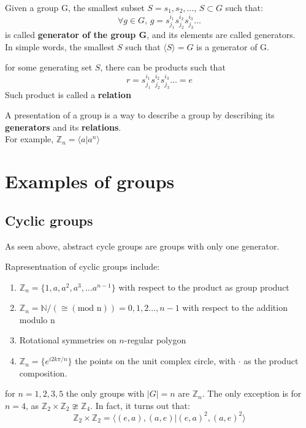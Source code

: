 \begin{definition}
  Given a group G, the smallest subset  $S={s_1,s_2,\dots}$,  $ S \subset G$ such that:
  \[
    \forall g \in G, \, g = s_{j_1}^{i_1}s_{j_2}^{i_2}s_{j_3}^{i_3} \dots
  \]
  is called \textbf{generator of the group G}, and its elements are called generators. \\
  In simple words, the smallest $S$ such that $\langle S \rangle = G$ is a generator of G.
\end{definition}
for some generating set $S$, there can be products such that
\[
  r = s_{j_1}^{i_1}s_{j_2}^{i_2}s_{j_3}^{i_3} \dots = e
\]
Such product is called a \textbf{relation}
\begin{definition}
  A presentation of a group is a way to describe a group by describing its \textbf{generators} and its \textbf{relations}.\\
  For example, $\mathbb{Z}_n = \langle a | a^n \rangle$
\end{definition}
\section{Examples of groups}
\subsection{Cyclic groups}
\begin{definition}
  As seen above, abstract cycle groups are groups with only one generator.
\end{definition}
Rapresentnation of cyclic groups include:
\begin{enumerate}
  \item $\mathbb{Z}_n = \{1, a, a^2, a^3,\dots a^{n-1}\}$ with respect to the product as group product
  \item 
$\mathbb{Z}_{n} = \mathbb{N} / (\cong (\text{mod n} )) = {0,1,2\dots,n-1}$ with respect to the addition modulo n
\item 
Rotational symmetries on $n$-regular polygon
\item
$\mathbb{Z}_n = \{ e^{i2k\pi / n} \}$ the points on the unit complex circle, with $ \cdot$ as the product composition.
\end{enumerate}

for $n =1,2,3,5$ the only groups with $|G| = n$ are $\mathbb{Z}_n$. The only exception is for $n=4$, as $\mathbb{Z}_2 \times \mathbb{Z}_2 \ncong \mathbb{Z}_4$. In fact, it turns out that:
\[
  \mathbb{Z}_2 \times \mathbb{Z}_2 = \langle (e,a), (a,e) | (e,a)^2, (a,e)^2 \rangle
\]


